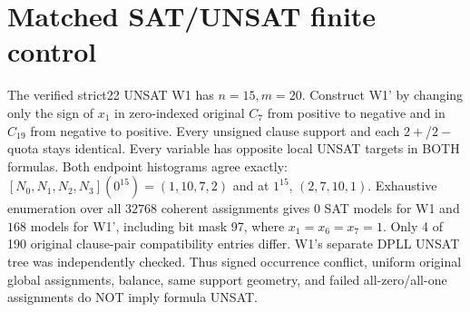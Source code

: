 \documentclass[10pt]{article}
\begin{document}
\section{Matched SAT/UNSAT finite control}
The verified strict22 UNSAT W1 has $n=15,m=20$. Construct W1' by changing only the sign of $x_1$ in zero-indexed original $C_7$ from positive to negative and in $C_{19}$ from negative to positive. Every unsigned clause support and each $2+$/$2-$ quota stays identical. Every variable has opposite local UNSAT targets in BOTH formulas. Both endpoint histograms agree exactly: $[N_0,N_1,N_2,N_3](0^{15})=(1,10,7,2)$ and at $1^{15}$, $(2,7,10,1)$. Exhaustive enumeration over all $32768$ coherent assignments gives $0$ SAT models for W1 and $168$ models for W1', including bit mask 97, where $x_1=x_6=x_7=1$. Only 4 of 190 original clause-pair compatibility entries differ. W1's separate DPLL UNSAT tree was independently checked. Thus signed occurrence conflict, uniform original global assignments, balance, same support geometry, and failed all-zero/all-one assignments do NOT imply formula UNSAT.
\end{document}
